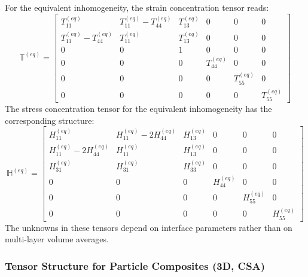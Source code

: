 \documentclass[oneside, 12pt, a4paper, bibliography=totoc]{book}
\begin{document}
For the equivalent inhomogeneity, the strain concentration tensor reads:
%
\begin{equation}
    \mathbb{T}^{(eq)} =
    \begin{bmatrix}
        T_{11}^{(eq)}  & T_{11}^{(eq)} - T_{44}^{(eq)} & T_{13}^{(eq)} & 0 & 0 & 0 \\[4pt]
        T_{11}^{(eq)} - T_{44}^{(eq)} &  T_{11}^{(eq)} & T_{13}^{(eq)} & 0 & 0 & 0 \\[4pt]
        0 & 0 & 1 & 0 & 0 & 0 \\[4pt]
        0 & 0 & 0 & T_{44}^{(eq)} & 0 & 0 \\[4pt]
        0 & 0 & 0 & 0 & T_{55}^{(eq)} & 0 \\[4pt]
        0 & 0 & 0 & 0 & 0 & T_{55}^{(eq)}
    \end{bmatrix}
    \label{eq:T_eq_interface_cca}
\end{equation}
The stress concentration tensor for the equivalent inhomogeneity has the corresponding structure:
%
\begin{equation}
    \mathbb{H}^{(eq)} =
    \begin{bmatrix}
        H_{11}^{(eq)} & H_{11}^{(eq)} - 2H_{44}^{(eq)} & H_{13}^{(eq)} & 0 & 0 & 0 \\[4pt]
        H_{11}^{(eq)} - 2H_{44}^{(eq)} & H_{11}^{(eq)} & H_{13}^{(eq)} & 0 & 0 & 0 \\[4pt]
        H_{31}^{(eq)} & H_{31}^{(eq)} & H_{33}^{(eq)} & 0 & 0 & 0 \\[4pt]
        0 & 0 & 0 & H_{44}^{(eq)} & 0 & 0 \\[4pt]
        0 & 0 & 0 & 0 & H_{55}^{(eq)} & 0 \\[4pt]
        0 & 0 & 0 & 0 & 0 & H_{55}^{(eq)}
    \end{bmatrix}
    \label{eq:H_eq_interface_cca}
\end{equation}
The unknowns in these tensors depend on interface parameters rather than on multi-layer volume averages.

\subsubsection{Tensor Structure for Particle Composites (3D, CSA)}
\end{document}
